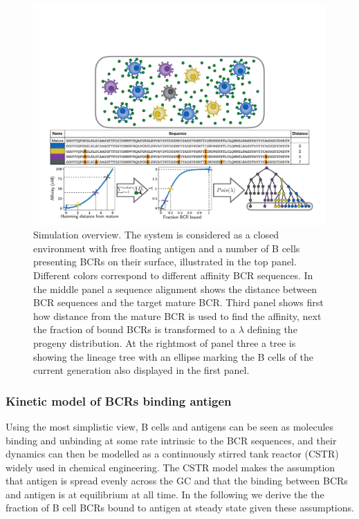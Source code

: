\clearpage
\begin{figure}[ht!]
    \centering
    \includegraphics[width=1\textwidth]{figures/simulation_figure.pdf}
    \caption{
        \label{fig:simulation_figure}
        Simulation overview.
        The system is considered as a closed environment with free floating antigen and a number of B cells presenting BCRs on their surface, illustrated in the top panel.
        Different colors correspond to different affinity BCR sequences.
        In the middle panel a sequence alignment shows the distance between BCR sequences and the target mature BCR.
        Third panel shows first how distance from the mature BCR is used to find the affinity, next the fraction of bound BCRs is transformed to a $\lambda$ defining the progeny distribution.
        At the rightmost of panel three a tree is showing the lineage tree with an ellipse marking the B cells of the current generation also displayed in the first panel.
    }
\end{figure}






\subsubsection{Kinetic model of BCRs binding antigen}
Using the most simplistic view, B cells and antigens can be seen as molecules binding and unbinding at some rate intrinsic to the BCR sequences, and their dynamics can then be modelled as a continuously stirred tank reactor (CSTR) \cite{CSTR} widely used in chemical engineering.
The CSTR model makes the assumption that antigen is spread evenly across the GC and that the binding between BCRs and antigen is at equilibrium at all time.
In the following we derive the the fraction of B cell BCRs bound to antigen at steady state given these assumptions.


